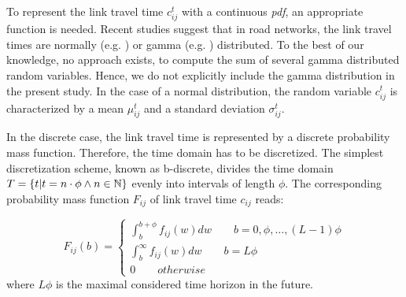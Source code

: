 To represent the link travel time $c_{ij}^t$ with a continuous \textit{pdf}, an appropriate function is needed. Recent studies suggest that in road networks, the link travel times are normally (e.g. \cite{Seshadri10}) or gamma (e.g. \cite{Zockaei13}) distributed. To the best of our knowledge, no approach exists, to compute the sum of several gamma distributed random variables. Hence, we do not explicitly include the gamma distribution in the present study. In the case of a normal distribution, the random variable $c_{ij}^t$ is characterized by a mean $\mu_{ij}^t$ and a standard deviation $\sigma_{ij}^t$.


In the discrete case, the link travel time is represented by a discrete probability mass function. Therefore, the time domain has to be discretized. The simplest discretization scheme, known as b-discrete, divides the time domain $T = \{t | t = n\cdot \phi \wedge n \in \mathbb{N} \}$ evenly into intervals of length $\phi$. The corresponding probability mass function $F_{ij}$ of link travel time $c_{ij}$ reads:

\begin{equation}
	F_{ij}(b) = \begin{cases}\int_b^{b+\phi}f_{ij}(w)dw \qquad b =
	0,\phi,\ldots, (L-1)\phi\\
	\int_b^{\infty}f_{ij}(w)dw \qquad b =
	L \phi\\
	0 \qquad otherwise
	\end{cases} 
\end{equation}
where $L \phi$ is the maximal considered time horizon in the future.


